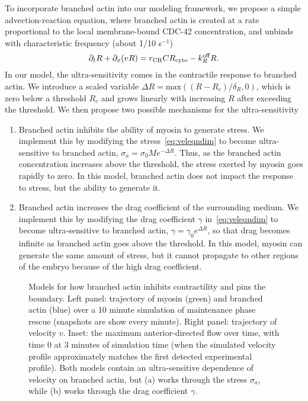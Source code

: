 \documentclass[11pt]{article}
\newcommand{\6}[1]{#1_{\text{6}}}
\newcommand{\3}[1]{#1_{\text{3}}}
\begin{document}
To incorporate branched actin into our modeling framework, we propose a simple advection-reaction equation, where branched actin is created at a rate proportional to the local membrane-bound CDC-42 concentration, and unbinds with characteristic frequency (about 1/10 s$^{-1}$)
\begin{equation}
\partial_t R + \partial_x (v R) =  r_\text{CR}C R_\text{cyto}-k^\text{off}_R R.
\end{equation}
In our model, the ultra-sensitivity comes in the contractile response to branched actin. We introduce a scaled variable $\Delta R = \text{max}\left(\left(R-R_c\right)/\delta_R,0\right)$, which is zero below a threshold $R_c$ and grows linearly with increasing $R$ after exceeding the threshold. We then propose two possible mechanisms for the ultra-sensitivity
\begin{enumerate}
\item Branched actin inhibits the ability of myosin to generate stress. We implement this by modifying the stress\ \eqref{eq:veleqndim} to become ultra-sensitive to branched actin, $\sigma_a =\sigma_0 M e^{-\Delta R}$. Thus, as the branched actin concentration increases above the threshold, the stress exerted by myosin goes rapidly to zero. In this model, branched actin does not impact the response to stress, but the ability to generate it. 
\item Branched actin increases the drag coefficient of the surrounding medium. We implement this by modifying the drag coefficient $\gamma$ in\ \eqref{eq:veleqndim} to become ultra-sensitive to branched actin, $\gamma = \gamma_0 e^{\Delta R}$, so that drag becomes infinite as branched actin goes above the threshold. In this model, myosin can generate the same amount of stress, but it cannot propagate to other regions of the embryo because of the high drag coefficient.
\end{enumerate}

\begin{figure}
\centering
{}
\caption{\label{fig:BAModelRes} Models for how branched actin inhibits contractility and pins the boundary. Left panel: trajectory of myosin (green) and branched actin (blue) over a 10 minute simulation of maintenance phase rescue (snapshots are show every minute). Right panel: trajectory of velocity $v$. Inset: the maximum anterior-directed flow over time, with time 0 at 3 minutes of simulation time (when the simulated velocity profile approximately matches the first detected experimental profile). Both models contain an ultra-sensitive dependence of velocity on branched actin, but (a) works through the stress $\sigma_a$, while (b) works through the drag coefficient $\gamma$.}
\end{figure}
\end{document}
